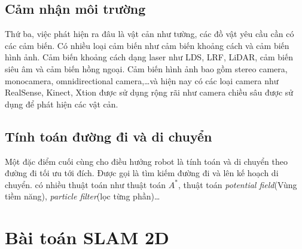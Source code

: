 \subsection*{Cảm nhận môi trường}
Thứ ba, việc phát hiện ra đâu là vật cản như tường, các đồ vật yêu cầu cần có các cảm biến. Có nhiều loại cảm biến như cảm biến khoảng cách và cảm biến hình ảnh. Cảm biến khoảng cách dạng laser như LDS, LRF, LiDAR, cảm biến siêu âm và cảm biến hồng ngoại. Cảm biến hình ảnh bao gồm stereo camera, monocamera, omnidirectional camera,\dots và hiện nay có các loại camera như RealSense, Kinect, Xtion được sử dụng rộng rãi như camera chiều sâu được sử dụng để phát hiện các vật cản.

\subsection*{Tính toán đường đi và di chuyển}
Một đặc điểm cuối cùng cho điều hưởng robot là tính toán và di chuyển theo đường đi tối ưu tới đích. Được gọi là tìm kiếm đường đi và lên kế hoạch di chuyển. có nhiều thuật toán như thuật toán ${A}^{*}$, thuật toán \textit{potential field}(Vùng tiềm năng), \textit{particle filter}(lọc từng phần)\dots

\section{Bài toán SLAM 2D}






